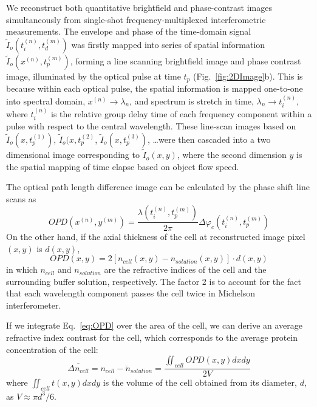 \documentclass[aps,pra,reprint,longbibliography,superscriptaddress]{revtex4-1}
\begin{document}
We reconstruct both quantitative brightfield and phase-contrast images simultaneously from single-shot frequency-multiplexed interferometric measurements. The envelope and phase of the time-domain signal $\tilde{I}_o (t_i^{(n)}, t_d^{(m)})$ was firstly mapped into series of spatial information $\tilde{I}_o(x^{(n)},t_p^{(m)})$, forming a line scanning brightfield image and phase contrast image, illuminated by the optical pulse at time $t_p$ (Fig.~\ref{fig:2DImage}b). This is because within each optical pulse, the spatial information is mapped one-to-one into spectral domain, $x^{(n)} \rightarrow \lambda_n$, and spectrum is stretch in time, $\lambda_n \rightarrow t_i^{(n)}$, where $t_i^{(n)}$ is the relative group delay time of each frequency component within a pulse with respect to the central wavelength. These line-scan images based on $\tilde{I}_o(x,t_p^{(1)})$, $\tilde{I}_o (x, t_p^{(2)}$, $\tilde{I}_o(x,t_p^{(3)})$, \ldots were then cascaded into a two dimensional image corresponding to $\tilde{I}_o(x,y)$, where the second dimension $y$ is the spatial mapping of time elapse based on object flow speed. 

The optical path length difference image can be calculated by the phase shift line scans as
\begin{equation}
OPD(x^{(n)},y^{(m)}) = \frac{\lambda(t_i^{(n)},t_p^{(m)})}{2\pi} \Delta\varphi_c(t_i^{(n)},t_p^{(m)})
\end{equation}
On the other hand, if the axial thickness of the cell at reconstructed image pixel $(x,y)$ is $d(x,y)$,
\begin{equation} \label{eq:OPD}
OPD(x,y) = 2 [n_{cell}(x,y) - n_{solution}(x,y)] \cdot d(x,y)
\end{equation}
in which $n_{cell}$ and $n_{solution}$ are the refractive indices of the cell and the surrounding buffer solution, respectively. The factor 2 is to account for the fact that each wavelength component passes the cell twice in Michelson interferometer. 

If we integrate Eq.~\ref{eq:OPD} over the area of the cell, we can derive an average refractive index contrast for the cell, which corresponds to the average protein concentration of the cell:
\begin{equation}
\overline{\Delta n_{cell}} = \overline{n_{cell} - n_{solution}} = \frac{\iint_{cell} OPD(x,y) dx dy}{2 V}
\end{equation}
where $\iint_{cell} t(x,y) dx dy$ is the volume of the cell obtained from its diameter, $d$, as $V \approx \pi d^3/6$. 
\end{document}
